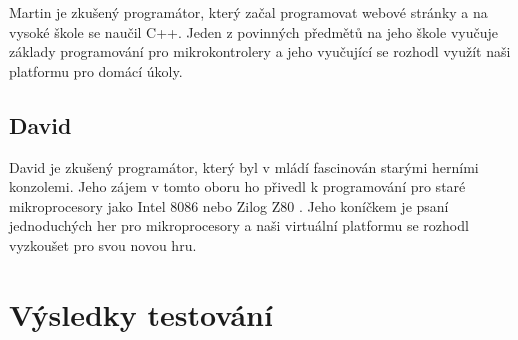 Martin je zkušený programátor, který začal programovat webové stránky a na vysoké škole se naučil C++. Jeden z povinných předmětů na jeho škole vyučuje základy programování pro mikrokontrolery a jeho vyučující se rozhodl využít naši platformu pro domácí úkoly.

\subsection{David}

David je zkušený programátor, který byl v mládí fascinován starými herními konzolemi. Jeho zájem v tomto oboru ho přivedl k programování pro staré mikroprocesory jako Intel 8086 nebo Zilog Z80 . Jeho koníčkem je psaní jednoduchých her pro mikroprocesory a naši virtuální platformu se rozhodl vyzkoušet pro svou novou hru.

\section{Výsledky testování}

\blind[2]